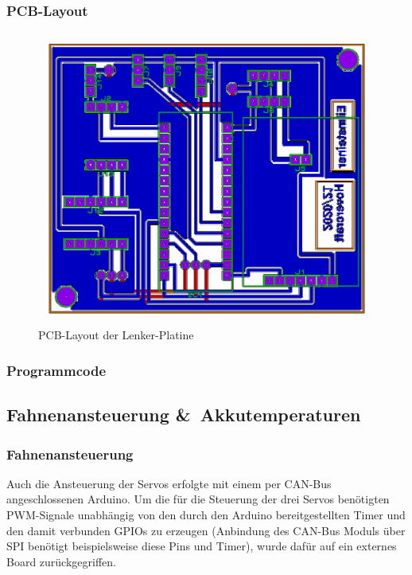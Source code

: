 \newpage

\subsubsection{PCB-Layout}
\begin{figure}[h]
    \centering
    \includegraphics[width=1.0\textwidth]{../Proteus/Exports/Lenker_Platine_PCB.png}    
    \caption{PCB-Layout der Lenker-Platine}
\end{figure}

\newpage
\subsubsection{Programmcode}


\newpage

\subsection{Fahnenansteuerung \&\ Akkutemperaturen}
\subsubsection{Fahnenansteuerung}
Auch die Ansteuerung der Servos erfolgte mit einem per CAN-Bus angeschlossenen Arduino. Um die für die Steuerung der drei Servos benötigten PWM-Signale unabhängig von den durch den Arduino bereitgestellten Timer und den damit verbunden GPIOs zu erzeugen 
(Anbindung des CAN-Bus Moduls über SPI benötigt beispielsweise diese Pins und Timer), wurde dafür auf ein externes Board zurückgegriffen.

